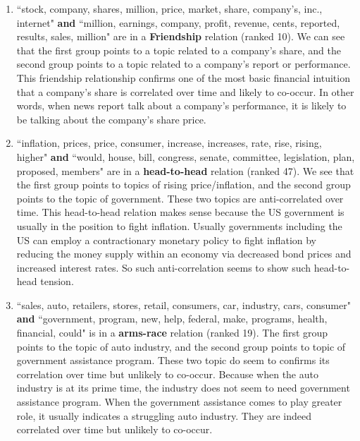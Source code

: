 \documentclass[11pt,a4paper]{article}
\newcommand\boldfriend[1]{\textcolor{green(html/cssgreen)}{\textbf{#1}}}
\newcommand\boldhead[1]{\textcolor{red-brown}{\textbf{#1}}}
\newcommand\boldarms[1]{\textcolor{blue(ncs)}{\textbf{#1}}}
\begin{document}
\begin{enumerate}
    \item ``stock, company, shares, million, price, market, share, company's, inc., internet" \textbf{and}
    ``million, earnings, company, profit, revenue, cents, reported, results, sales, million" are in a \boldfriend{Friendship} relation (ranked 10). We can see that the first group points to a topic related to a company's share, and the second group points to a topic related to a company's report or performance. This friendship relationship confirms one of the most basic financial intuition that a company's share is correlated over time and likely to co-occur. In other words, when news report talk about a company's performance, it is likely to be talking about the company's share price. \\
    \item ``inflation, prices, price, consumer, increase, increases, rate, rise, rising, higher"
    \textbf{and} 
    ``would, house, bill, congress, senate, committee, legislation, plan, proposed, members" are in a
    \boldhead{head-to-head} relation (ranked 47). We see that the first group points to topics of rising price/inflation, and the second group points to the topic of government. These two topics are anti-correlated over time. This head-to-head relation makes sense because the US government is usually in the position to fight inflation. Usually governments including the US can employ a contractionary monetary policy to fight inflation by reducing the money supply within an economy via decreased bond prices and increased interest rates. So such anti-correlation seems to show such head-to-head tension.  
    
    \item ``sales, auto, retailers, stores, retail, consumers, car, industry, cars, consumer" 
    \textbf{and}
    ``government, program, new, help, federal, make, programs, health, financial, could" is in a \boldarms{arms-race} relation (ranked 19). The first group points to the topic of auto industry, and the second group points to topic of government assistance program. These two topic do seem to confirms its correlation over time but unlikely to co-occur. Because when the auto industry is at its prime time, the industry does not seem to need government assistance program. When the government assistance comes to play greater role, it usually indicates a struggling auto industry. They are indeed correlated over time but unlikely to co-occur. \\
    

\end{enumerate}
\end{document}
